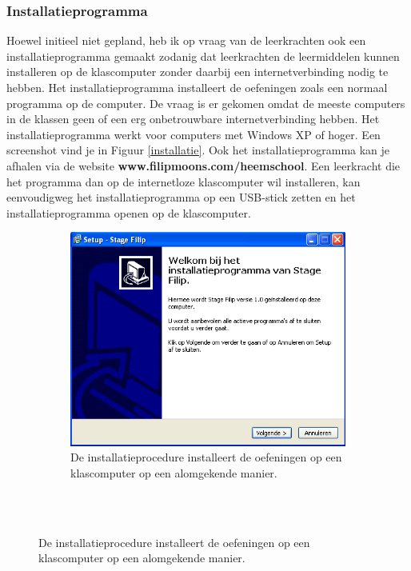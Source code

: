 \documentclass[a4paper,11pt]{article}
\theoremstyle{definition}
\begin{document}
\begin{itemize}
\begin{itemize}
\subsubsection{Installatieprogramma}
Hoewel initieel niet gepland, heb ik op vraag van de leerkrachten ook een installatieprogramma gemaakt 
zodanig dat leerkrachten de leermiddelen kunnen installeren op de klascomputer zonder daarbij een internetverbinding nodig te hebben. 
Het installatieprogramma installeert de oefeningen zoals een normaal programma op 
de computer.
De vraag is er gekomen omdat de meeste computers in de klassen geen of een erg onbetrouwbare 
internetverbinding hebben.  Het installatieprogramma werkt voor 
computers met Windows XP of hoger. Een screenshot vind 
je in Figuur \ref{installatie}. Ook het installatieprogramma kan je afhalen via 
de website \textbf{www.filipmoons.com/heemschool}. Een leerkracht die het 
programma dan op de internetloze klascomputer wil installeren, kan eenvoudigweg het 
installatieprogramma op een USB-stick zetten en het installatieprogramma openen op de klascomputer.

\begin{figure}[h!]
        \centering
        
        \begin{subfigure}{1\textwidth}
          \centering
                \includegraphics[scale=0.5]{installatie.png}
                \caption{De installatieprocedure installeert de oefeningen op een klascomputer op een alomgekende manier.}
        \end{subfigure}%
        \\
        \quad
        \\
        

\end{figure}
\end{itemize}
\end{itemize}
\end{document}

